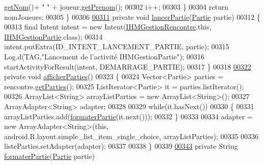 \begin{DoxyCode}
      \hyperlink{classcom_1_1example_1_1area_1_1_joueur_a4e43a9187363501204af7b2f2c84a9a4}{getNom}()+ \textcolor{stringliteral}{" "} + joueur.\hyperlink{classcom_1_1example_1_1area_1_1_joueur_ac2cd099ccfc34c48fbabde5649514a27}{getPrenom}();
00302             i++;
00303         \}
00304         \textcolor{keywordflow}{return} nomJoueurs;
00305     \}
00306 
\hyperlink{classcom_1_1example_1_1area_1_1_i_h_m_gestion_rencontre_a284518fddedfaed4b257f852290e1e63}{00311}     \textcolor{keyword}{private} \textcolor{keywordtype}{void} \hyperlink{classcom_1_1example_1_1area_1_1_i_h_m_gestion_rencontre_a284518fddedfaed4b257f852290e1e63}{lancerPartie}(\hyperlink{classcom_1_1example_1_1area_1_1_partie}{Partie} partie)
00312     \{
00313         \textcolor{keyword}{final} Intent intent = \textcolor{keyword}{new} Intent(\hyperlink{classcom_1_1example_1_1area_1_1_i_h_m_gestion_rencontre}{IHMGestionRencontre}.this, 
      \hyperlink{classcom_1_1example_1_1area_1_1_i_h_m_gestion_partie}{IHMGestionPartie}.class);
00314         intent.putExtra(ID\_INTENT\_LANCEMENT\_PARTIE, partie);
00315         Log.d(TAG,\textcolor{stringliteral}{"Lancement de l'activité IHMGestionPartie"});
00316         startActivityForResult(intent, DEMARRAGE\_PARTIE);
00317     \}
00318 
\hyperlink{classcom_1_1example_1_1area_1_1_i_h_m_gestion_rencontre_a5d86e4705a4bbea19f05781403df4742}{00322}     \textcolor{keyword}{private} \textcolor{keywordtype}{void} \hyperlink{classcom_1_1example_1_1area_1_1_i_h_m_gestion_rencontre_a5d86e4705a4bbea19f05781403df4742}{afficherParties}()
00323     \{
00324         Vector<Partie> parties = rencontre.\hyperlink{classcom_1_1example_1_1area_1_1_rencontre_a58b62bd2f8a63f532df2bc8607268a2d}{getParties}();
00325         ListIterator<Partie> it = parties.listIterator();
00326         ArrayList<String> arrayListParties = \textcolor{keyword}{new} ArrayList<String>();
00327         ArrayAdapter<String> adapter;
00328 
00329         \textcolor{keywordflow}{while}(it.hasNext())
00330         \{
00331             arrayListParties.add(\hyperlink{classcom_1_1example_1_1area_1_1_i_h_m_gestion_rencontre_aadc556a63bb77b707f4677c34d61dae5}{formaterPartie}(it.next()));
00332         \}
00333 
00334         adapter = \textcolor{keyword}{new} ArrayAdapter<String>(\textcolor{keyword}{this}, android.R.layout.simple\_list\_item\_single\_choice, 
      arrayListParties);
00335 
00336         listeParties.setAdapter(adapter);
00337 
00338     \}
00339 
\hyperlink{classcom_1_1example_1_1area_1_1_i_h_m_gestion_rencontre_aadc556a63bb77b707f4677c34d61dae5}{00343}     \textcolor{keyword}{private} String \hyperlink{classcom_1_1example_1_1area_1_1_i_h_m_gestion_rencontre_aadc556a63bb77b707f4677c34d61dae5}{formaterPartie}(\hyperlink{classcom_1_1example_1_1area_1_1_partie}{Partie} partie)

\end{DoxyCode}

